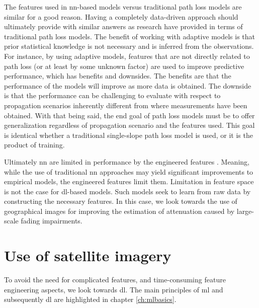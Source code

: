 The features used in \gls{nn}-based models versus traditional path loss models are similar for a good reason. Having a completely data-driven approach should ultimately provide with similar answers as research have provided in terms of traditional path loss models. The benefit of working with adaptive models is that prior statistical knowledge is not necessary and is inferred from the observations. For instance, by using adaptive models, features that are not directly related to path loss (or at least by some unknown factor) are used to improve predictive performance, which has benefits and downsides. The benefits are that the performance of the models will improve as more data is obtained. The downside is that the performance can be challenging to evaluate with respect to propagation scenarios inherently different from where measurements have been obtained. With that being said, the end goal of path loss models must be to offer generalization regardless of propagation scenario and the features used. This goal is identical whether a traditional single-slope path loss model is used, or it is the product of training. 

Ultimately \gls{nn} are limited in performance by the engineered features \cite{Alom2019AArchitectures}. Meaning, while the use of traditional \gls{nn} approaches may yield significant improvements to empirical models, the engineered features limit them. Limitation in feature space is not the case for \gls{dl}-based models. Such models seek to learn from raw data by constructing the necessary features. In this case, we look towards the use of geographical images for improving the estimation of attenuation caused by large-scale fading impairments.


\section{Use of satellite imagery}

To avoid the need for complicated features, and time-consuming feature engineering aspects, we look towards \gls{dl}. The main principles of \gls{ml} and subsequently \gls{dl} are highlighted in chapter \ref{ch:mlbasics}. 

